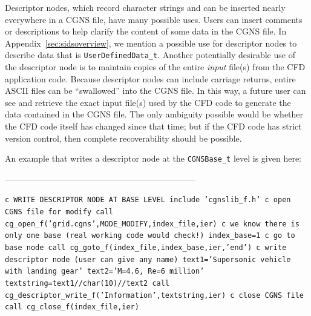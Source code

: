 \documentclass[12pt]{article}
\begin{document}
Descriptor nodes, which record character strings and can be
inserted nearly everywhere in a CGNS file, have many 
possible uses.
Users can insert comments or descriptions
to help clarify the content of some data in the CGNS file.  In Appendix~\ref{sec:sidsoverview},
we mention a possible use for descriptor nodes to describe
data that is {\tt UserDefinedData\_t}.
Another potentially desirable use of the descriptor node is
to maintain copies of the entire {\it input} file(s)
from the CFD application code.  Because descriptor nodes
can include carriage returns, entire ASCII files can be 
``swallowed'' into the CGNS file.  In this way, a future user
can see and retrieve the exact input file(s) used by
the CFD code to generate
the data contained in the CGNS file.  The only ambiguity
possible would be whether the CFD code itself has changed since
that time; but if the CFD code has strict version control,
then complete recoverability should be possible.

An example that writes a descriptor node at the {\tt CGNSBase\_t} level
is given here:

--------------------------------------------------------------------

{\tt \noindent c  WRITE DESCRIPTOR NODE AT BASE LEVEL
\newline\indent      include 'cgnslib\_f.h'
\newline c  open CGNS file for modify
\newline\indent      call cg\_open\_f('grid.cgns',MODE\_MODIFY,index\_file,ier)
\newline c  we know there is only one base (real working code would check!)
\newline\indent      index\_base=1
\newline c   go to base node
\newline\indent      call cg\_goto\_f(index\_file,index\_base,ier,'end')
\newline c   write descriptor node (user can give any name)
\newline\indent      text1='Supersonic vehicle with landing gear'
\newline\indent      text2='M=4.6, Re=6 million'
\newline\indent      textstring=text1//char(10)//text2
\newline\indent      call cg\_descriptor\_write\_f('Information',textstring,ier)
\newline c  close CGNS file
\newline\indent      call cg\_close\_f(index\_file,ier)}
\end{document}
